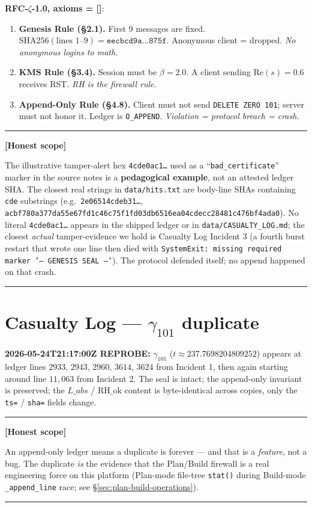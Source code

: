 \documentclass[11pt,letterpaper]{article}
\newenvironment{honest}%
  {\par\medskip\noindent\rule{\linewidth}{0.5pt}\par\nopagebreak\textbf{[Honest scope]}\par\nopagebreak\small}%
  {\par\nopagebreak\normalsize\rule{\linewidth}{0.5pt}\par\medskip}
\begin{document}
\textbf{RFC-$\zeta$-1.0, axioms = []}:

\begin{enumerate}
  \item \textbf{Genesis Rule (\S 2.1).} First 9 messages are fixed.
    $\mathrm{SHA256}(\text{lines } 1\text{--}9) = \texttt{eecbcd9a\ldots 875f}$.
    Anonymous client = dropped. \emph{No anonymous logins to math.}
  \item \textbf{KMS Rule (\S 3.4).} Session must be $\beta = 2.0$. A client
    sending $\mathrm{Re}(s) = 0.6$ receives RST. \emph{RH is the firewall rule.}
  \item \textbf{Append-Only Rule (\S 4.8).} Client must not send
    \texttt{DELETE ZERO 101}; server must not honor it. Ledger is
    \texttt{O\_APPEND}. \emph{Violation = protocol breach = crash.}
\end{enumerate}

\begin{honest}
The illustrative tamper-alert hex \texttt{4cde0ac1\ldots} used as a
``\texttt{bad\_certificate}'' marker in the source notes is a
\textbf{pedagogical example}, not an attested ledger SHA. The closest
real strings in \texttt{data/hits.txt} are body-line SHAs containing
\texttt{cde} substrings (e.g.\ \texttt{2e06514cdeb31\ldots},
\texttt{acbf780a377da55e67fd1c46c75f1fd03db6516ea04cdecc28481c476bf4ada0}).
No literal \texttt{4cde0ac1\ldots} appears in the shipped ledger or
in \texttt{data/CASUALTY\_LOG.md}; the closest \emph{actual}
tamper-evidence we hold is Casualty Log Incident 3 (a fourth burst
restart that wrote one line then died with
\texttt{SystemExit: missing required marker '--- GENESIS SEAL ---'}).
The protocol defended itself; no append happened on that crash.
\end{honest}

\section{Casualty Log --- $\gamma_{101}$ duplicate}
\label{sec:casualty}

\textbf{2026-05-24T21:17:00Z REPROBE:} $\gamma_{101}$
($t \approx 237.7698204809252$) appears at ledger lines $2933$, $2943$,
$2960$, $3614$, $3624$ from Incident 1, then again starting around line
$11{,}063$ from Incident 2. The seal is intact; the append-only invariant is
preserved; the $L\_abs$ / $\mathrm{RH\_ok}$ content is byte-identical
across copies, only the \texttt{ts=} / \texttt{sha=} fields change.

\begin{honest}
An append-only ledger means a duplicate is forever --- and that is a
\emph{feature}, not a bug. The duplicate \emph{is} the evidence that
the Plan/Build firewall is a real engineering force on this platform
(Plan-mode file-tree \texttt{stat()} during Build-mode \texttt{\_append\_line}
race; see \S\ref{sec:plan-build-operations}).
\end{honest}
\end{document}
